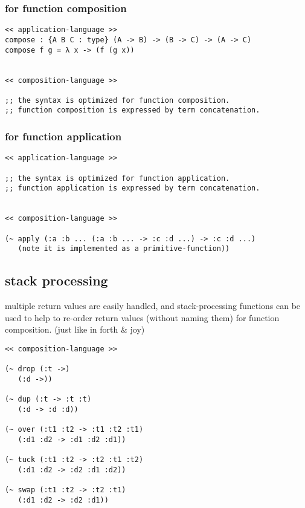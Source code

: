 \documentclass{sigplanconf}
\begin{document}
\subsubsection{for function composition}

{\scriptsize\begin{verbatim}
<< application-language >>
compose : {A B C : type} (A -> B) -> (B -> C) -> (A -> C)
compose f g = λ x -> (f (g x))


<< composition-language >>

;; the syntax is optimized for function composition.
;; function composition is expressed by term concatenation.
\end{verbatim}}

\subsubsection{for function application}

{\scriptsize\begin{verbatim}
<< application-language >>

;; the syntax is optimized for function application.
;; function application is expressed by term concatenation.


<< composition-language >>

(~ apply (:a :b ... (:a :b ... -> :c :d ...) -> :c :d ...)
   (note it is implemented as a primitive-function))
\end{verbatim}}

\subsection{stack processing}

multiple return values are easily handled,
and stack-processing functions can be used to help to
re-order return values (without naming them) for function composition.
(just like in forth \& joy)

{\scriptsize\begin{verbatim}
<< composition-language >>

(~ drop (:t ->)
   (:d ->))

(~ dup (:t -> :t :t)
   (:d -> :d :d))

(~ over (:t1 :t2 -> :t1 :t2 :t1)
   (:d1 :d2 -> :d1 :d2 :d1))

(~ tuck (:t1 :t2 -> :t2 :t1 :t2)
   (:d1 :d2 -> :d2 :d1 :d2))

(~ swap (:t1 :t2 -> :t2 :t1)
   (:d1 :d2 -> :d2 :d1))
\end{verbatim}}
\end{document}

